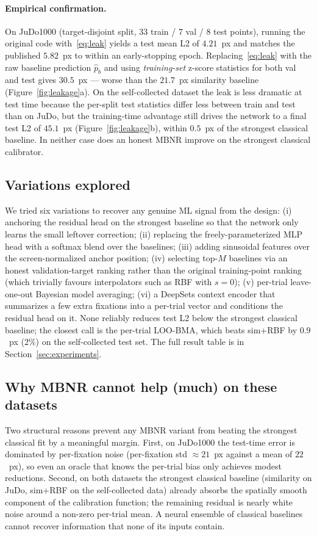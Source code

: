 \paragraph{Empirical confirmation.}
On JuDo1000 (target-disjoint split, 33 train / 7 val / 8 test points),
running the original code with~\eqref{eq:leak} yields a test mean L2 of
$4.21$~px and matches the published $5.82$~px to within an early-stopping
epoch. Replacing~\eqref{eq:leak} with the raw baseline prediction
$\hat{p}_b$ and using \emph{training-set} z-score statistics for both
val and test gives $30.5$~px --- worse than the $21.7$~px similarity
baseline (Figure~\ref{fig:leakage}a). On the self-collected dataset the
leak is less dramatic at test time because the per-split test
statistics differ less between train and test than on JuDo, but the
training-time advantage still drives the network to a final test L2 of
$45.1$~px (Figure~\ref{fig:leakage}b), within $0.5$~px of the strongest
classical baseline. In neither case does an honest MBNR improve on the
strongest classical calibrator.

\subsection{Variations explored}

We tried six variations to recover any genuine ML signal from the design:
(i) anchoring the residual head on the strongest baseline so that the
network only learns the small leftover correction; (ii) replacing the
freely-parameterized MLP head with a softmax blend over the baselines;
(iii) adding sinusoidal features over the screen-normalized anchor
position; (iv) selecting top-$M$ baselines via an honest validation-target
ranking rather than the original training-point ranking (which trivially
favours interpolators such as RBF with $s=0$); (v) per-trial
leave-one-out Bayesian model averaging; (vi) a DeepSets context encoder
that summarizes a few extra fixations into a per-trial vector and
conditions the residual head on it. None reliably reduces test L2 below
the strongest classical baseline; the closest call is the per-trial
LOO-BMA, which beats sim+RBF by $0.9$~px ($2\%$) on the self-collected
test set. The full result table is in Section~\ref{sec:experiments}.

\subsection{Why MBNR cannot help (much) on these datasets}

Two structural reasons prevent any MBNR variant from beating the
strongest classical fit by a meaningful margin. First, on JuDo1000 the
test-time error is dominated by per-fixation noise (per-fixation std
$\approx 21$~px against a mean of $22$~px), so even an oracle that
knows the per-trial bias only achieves modest reductions. Second, on
both datasets the strongest classical baseline (similarity on JuDo,
sim+RBF on the self-collected data) already absorbs the spatially
smooth component of the calibration function; the remaining residual
is nearly white noise around a non-zero per-trial mean. A neural
ensemble of classical baselines cannot recover information that none
of its inputs contain.
